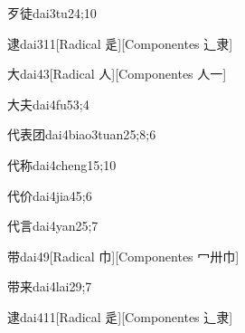 \begin{verbete}{歹徒}{dai3tu2}{4;10}
\end{verbete}

\begin{verbete}{逮}{dai3}{11}[Radical 辵][Componentes ⻌隶]
\end{verbete}

\begin{verbete}{大}{dai4}{3}[Radical ⼈][Componentes ⼈⼀]
\end{verbete}

\begin{verbete}{大夫}{dai4fu5}{3;4}
\end{verbete}

\begin{verbete}{代表团}{dai4biao3tuan2}{5;8;6}
\end{verbete}

\begin{verbete}{代称}{dai4cheng1}{5;10}
\end{verbete}

\begin{verbete}{代价}{dai4jia4}{5;6}
\end{verbete}

\begin{verbete}{代言}{dai4yan2}{5;7}
\end{verbete}

\begin{verbete}{带}{dai4}{9}[Radical ⼱][Componentes ⼍卅⼱]
\end{verbete}

\begin{verbete}{带来}{dai4lai2}{9;7}
\end{verbete}

\begin{verbete}{逮}{dai4}{11}[Radical 辵][Componentes ⻌隶]
\end{verbete}

